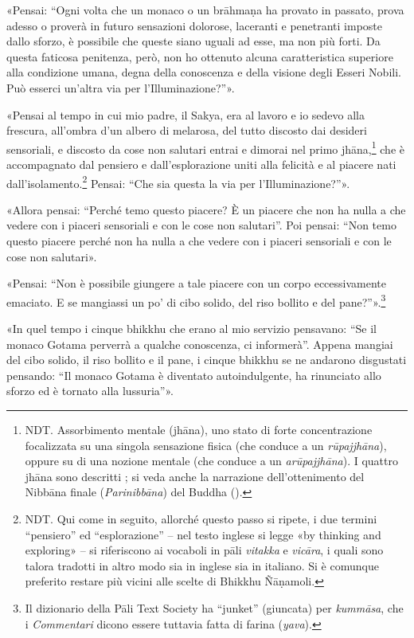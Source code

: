 
«Pensai: “Ogni volta che un monaco o un brāhmaṇa ha provato in passato, prova
adesso o proverà in futuro sensazioni dolorose, laceranti e penetranti imposte
dallo sforzo, è possibile che queste siano uguali ad esse, ma non più forti. Da
questa faticosa penitenza, però, non ho ottenuto alcuna caratteristica superiore
alla condizione umana, degna della conoscenza e della visione degli Esseri
Nobili. Può esserci un’altra via per l’Illuminazione?”».

«Pensai al tempo in cui mio padre, il Sakya, era al lavoro e io sedevo alla
frescura, all’ombra d’un albero di melarosa, del tutto discosto dai desideri
sensoriali, e discosto da cose non salutari entrai e dimorai nel primo
jhāna,\footnote{NDT. Assorbimento mentale (jhāna), uno stato di forte
  concentrazione focalizzata su una singola sensazione fisica (che conduce a un
  \emph{rūpajjhāna}), oppure su di una nozione mentale (che conduce a un
  \emph{arūpajjhāna}). I quattro jhāna sono descritti \hyperlink{pag27}{}; si
  veda anche la narrazione dell’ottenimento del Nibbāna finale
  (\emph{Parinibbāna}) del Buddha (\hyperlink{cap-15-L-ultimo-anno#pag364}{}).}
che è accompagnato dal pensiero e dall’esplorazione uniti alla felicità e al
piacere nati dall’isolamento.\footnote{NDT. Qui come in seguito, allorché questo
  passo si ripete, i due termini “pensiero” ed “esplorazione” – nel testo
  inglese si legge «by thinking and exploring» – si riferiscono ai vocaboli in
  pāli \emph{vitakka} e \emph{vicāra}, i quali sono talora tradotti in altro
  modo sia in inglese sia in italiano. Si è comunque preferito restare più
  vicini alle scelte di Bhikkhu Ñāṇamoli.} Pensai: “Che sia questa la via per
l’Illuminazione?”».

«Allora pensai: “Perché temo questo piacere? È un piacere che non ha nulla a che
vedere con i piaceri sensoriali e con le cose non salutari”. Poi pensai: “Non
temo questo piacere perché non ha nulla a che vedere con i piaceri sensoriali e
con le cose non salutari».

«Pensai: “Non è possibile giungere a tale piacere con un corpo eccessivamente
emaciato. E se mangiassi un po’ di cibo solido, del riso bollito e del
pane?”».\footnote{Il dizionario della Pāli Text Society ha “junket” (giuncata)
  per \emph{kummāsa}, che i \emph{Commentari} dicono essere tuttavia fatta di
  farina (\emph{yava}).}

«In quel tempo i cinque bhikkhu che erano al mio servizio pensavano: “Se il
monaco Gotama perverrà a qualche conoscenza, ci informerà”. Appena mangiai del
cibo solido, il riso bollito e il pane, i cinque bhikkhu se ne andarono
disgustati pensando: “Il monaco Gotama è diventato autoindulgente, ha rinunciato
allo sforzo ed è tornato alla lussuria”».

